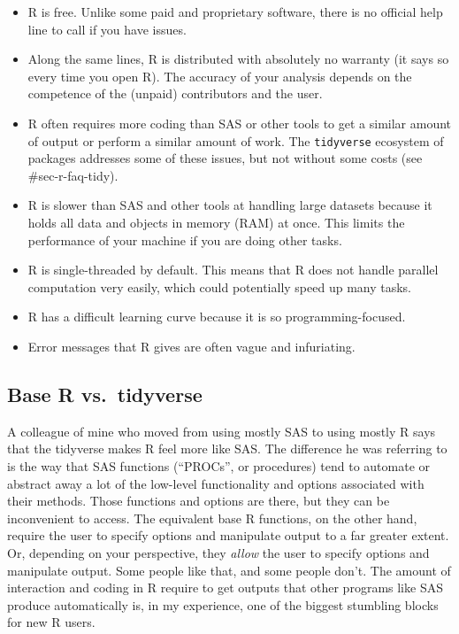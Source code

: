 \documentclass[
  13,
  letterpaper,
]{report}
\begin{document}
\begin{itemize}
\item
  R is free. Unlike some paid and proprietary software, there is no
  official help line to call if you have issues.
\item
  Along the same lines, R is distributed with absolutely no warranty (it
  says so every time you open R). The accuracy of your analysis depends
  on the competence of the (unpaid) contributors and the user.
\item
  R often requires more coding than SAS or other tools to get a similar
  amount of output or perform a similar amount of work. The
  \texttt{tidyverse} ecosystem of packages addresses some of these
  issues, but not without some costs (see \#sec-r-faq-tidy).
\item
  R is slower than SAS and other tools at handling large datasets
  because it holds all data and objects in memory (RAM) at once. This
  limits the performance of your machine if you are doing other tasks.
\item
  R is single-threaded by default. This means that R does not handle
  parallel computation very easily, which could potentially speed up
  many tasks.
\item
  R has a difficult learning curve because it is so programming-focused.
\item
  Error messages that R gives are often vague and infuriating.
\end{itemize}

\subsection{Base R vs.~tidyverse}\label{sec-r-faq-tidy}

A colleague of mine who moved from using mostly SAS to using mostly R
says that the tidyverse makes R feel more like SAS. The difference he
was referring to is the way that SAS functions (``PROCs'', or
procedures) tend to automate or abstract away a lot of the low-level
functionality and options associated with their methods. Those functions
and options are there, but they can be inconvenient to access. The
equivalent base R functions, on the other hand, require the user to
specify options and manipulate output to a far greater extent. Or,
depending on your perspective, they \emph{allow} the user to specify
options and manipulate output. Some people like that, and some people
don't. The amount of interaction and coding in R require to get outputs
that other programs like SAS produce automatically is, in my experience,
one of the biggest stumbling blocks for new R users.
\end{document}
